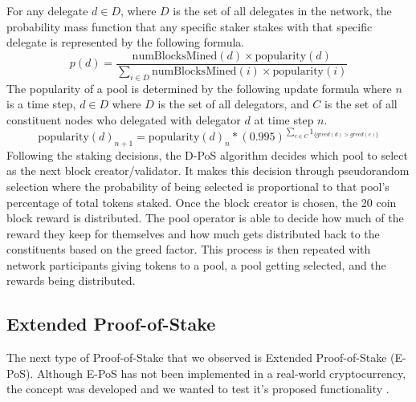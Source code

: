 For any delegate $d \in D$, where $D$ is the set of all delegates in the network, the probability mass function that any specific staker stakes with that specific delegate is represented by the following formula. 
\begin{equation}
p(d) = \frac{\mbox{numBlocksMined}(d) \times \mbox{popularity}(d)}{\sum_{i \in D} \mbox{numBlocksMined}(i) \times \mbox{popularity}(i)} 
\end{equation}
The popularity of a pool is determined by the following update formula where $n$ is a time step, $d \in D$ where $D$ is the set of all delegators, and $C$ is the set of all constituent nodes who delegated with delegator $d$ at time step $n$.
\begin{equation}
\mbox{popularity}(d)_{n+1} = \mbox{popularity}(d)_n * (0.995)^{\sum_{c \in C}1_{\{greed(d) > greed(c)\}}}
\end{equation}
Following the staking decisions, the D-PoS algorithm decides which pool to select as the next block creator\slash validator. It makes this decision through pseudorandom selection where the probability of being selected is proportional to that pool's percentage of total tokens staked. Once the block creator is chosen, the 20 coin block reward is distributed. The pool operator is able to decide how much of the reward they keep for themselves and how much gets distributed back to the constituents based on the greed factor. This process is then repeated with network participants giving tokens to a pool, a pool getting selected, and the rewards being distributed.

\subsection{Extended Proof-of-Stake}
The next type of Proof-of-Stake that we observed is Extended Proof-of-Stake (E-PoS). Although E-PoS has not been implemented in a real-world cryptocurrency, the concept was developed and we wanted to test it's proposed functionality \cite{CRYPTO:11}.

